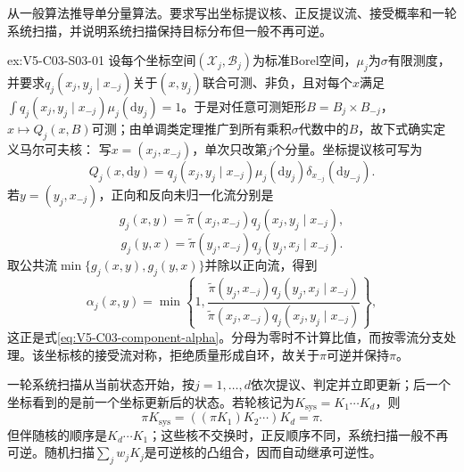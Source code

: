 \begin{SLChapterExercisePairSection}

\SLSourceBookExercises

\begin{exercise}\label{ex:V5-C03-S03-01}
从一般\MetropolisHastings{}算法推导单分量\MetropolisHastings{}算法。要求写出坐标提议核、正反提议流、接受概率和一轮系统扫描，并说明系统扫描保持目标分布但一般不再可逆。
\end{exercise}
\ifSLFullEdition
{}\label{sol:V5-C03-S03-01}
\begin{chapterexercisesolution}{ex:V5-C03-S03-01}
设每个坐标空间$(\mathcal X_j,\mathcal B_j)$为标准Borel空间，$\mu_j$为$\sigma$有限测度，并要求$q_j(x_j,y_j\mid x_{-j})$关于$(x,y_j)$联合可测、非负，且对每个$x$满足$\int q_j(x_j,y_j\mid x_{-j})\mu_j(\mathrm dy_j)=1$。于是对任意可测矩形$B=B_j\times B_{-j}$，$x\mapsto Q_j(x,B)$可测；由单调类定理推广到所有乘积$\sigma$代数中的$B$，故下式确实定义马尔可夫核：
写$x=(x_j,x_{-j})$，单次只改第$j$个分量。坐标提议核可写为
\[
Q_j(x,\mathrm dy)
=q_j(x_j,y_j\mid x_{-j})\mu_j(\mathrm dy_j)
\delta_{x_{-j}}(\mathrm dy_{-j}).
\]
若$y=(y_j,x_{-j})$，正向和反向未归一化流分别是
\[
g_j(x,y)=\widetilde\pi(x_j,x_{-j})
q_j(x_j,y_j\mid x_{-j}),
\]
\[
g_j(y,x)=\widetilde\pi(y_j,x_{-j})
q_j(y_j,x_j\mid x_{-j}).
\]
取公共流$\min\{g_j(x,y),g_j(y,x)\}$并除以正向流，得到
\[
\alpha_j(x,y)
=\min\!\left\{1,
\frac{\widetilde\pi(y_j,x_{-j})
q_j(y_j,x_j\mid x_{-j})}
{\widetilde\pi(x_j,x_{-j})
q_j(x_j,y_j\mid x_{-j})}\right\},
\]
这正是式\eqref{eq:V5-C03-component-alpha}。分母为零时不计算比值，而按零流分支处理。该坐标核的接受流对称，拒绝质量形成自环，故关于$\pi$可逆并保持$\pi$。

一轮系统扫描从当前状态开始，按$j=1,\ldots,d$依次提议、判定并立即更新；后一个坐标看到的是前一个坐标更新后的状态。若轮核记为$K_{\mathrm{sys}}=K_1\cdots K_d$，则
\[
\pi K_{\mathrm{sys}}
=((\pi K_1)K_2\cdots)K_d=\pi.
\]
但伴随核的顺序是$K_d\cdots K_1$；这些核不交换时，正反顺序不同，系统扫描一般不再可逆。随机扫描$\sum_jw_jK_j$是可逆核的凸组合，因而自动继承可逆性。
\end{chapterexercisesolution}
\fi


\end{SLChapterExercisePairSection}
